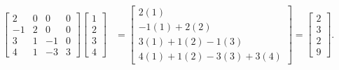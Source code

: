 \documentclass{report}
\begin{document}
    \begin{align*}
        \begin{bmatrix}
            2 & 0 & 0 & 0 \\
            -1 & 2 & 0 & 0 \\
            3 & 1 & -1 & 0 \\
            4 & 1 & -3 & 3
        \end{bmatrix}
        \begin{bmatrix}
            1 \\ 2 \\ 3 \\4
        \end{bmatrix}
        &= \begin{bmatrix}
            2(1) \\
            -1(1) + 2(2) \\
            3(1) + 1(2)-1(3) \\
            4(1) + 1(2) -3(3) + 3(4)
        \end{bmatrix}
        = \begin{bmatrix}
            2 \\ 3 \\ 2 \\ 9
        \end{bmatrix}
    .\end{align*}
\end{document}
